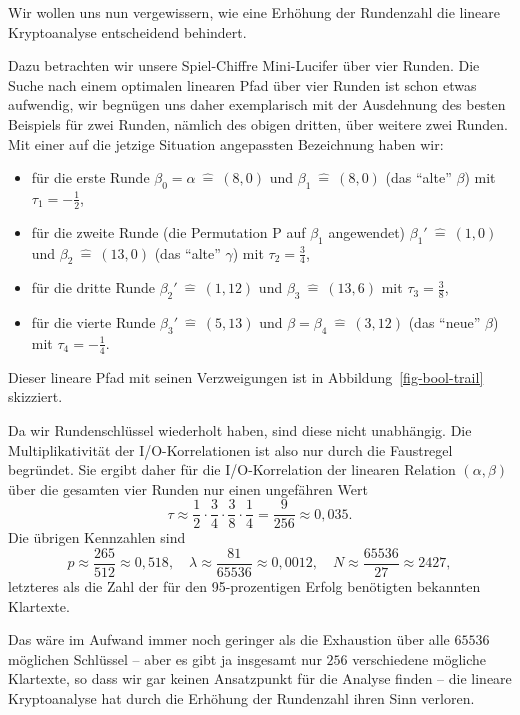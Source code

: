 \begin{refsegment}
Wir wollen uns nun vergewissern, wie eine Erhöhung der Rundenzahl die
lineare Kryptoanalyse
entscheidend behindert.

Dazu betrachten wir unsere Spiel-Chiffre Mini-Lucifer
über vier Runden. Die Suche nach einem optimalen linearen
Pfad über vier Runden ist
schon etwas aufwendig, wir begnügen uns daher exemplarisch mit der
Ausdehnung des besten Beispiels für zwei Runden, nämlich des obigen
dritten, über weitere zwei Runden. Mit einer auf die jetzige
Situation angepassten Bezeichnung haben wir:
\begin{itemize}
   \item für die erste Runde $\beta_0 = \alpha \:\hat{=}\: (8,0)$ und
      $\beta_1 \:\hat{=}\: (8,0)$ (das "`alte"' $\beta$)
      mit $\tau_1 = -\frac{1}{2}$,
   \item für die zweite Runde (die Permutation P auf $\beta_1$ angewendet)
      $\beta_1' \:\hat{=}\: (1,0)$ und $\beta_2 \:\hat{=}\: (13,0)$
      (das "`alte"' $\gamma$) mit $\tau_2 = \frac{3}{4}$,
   \item für die dritte Runde $\beta_2' \:\hat{=}\: (1,12)$ und
      $\beta_3 \:\hat{=}\: (13,6)$ mit $\tau_3 = \frac{3}{8}$,
   \item für die vierte Runde $\beta_3' \:\hat{=}\: (5,13)$ und
      $\beta = \beta_4 \:\hat{=}\: (3,12)$ (das "`neue"' $\beta$)
      mit $\tau_4 = -\frac{1}{4}$.
\end{itemize}
Dieser lineare Pfad mit seinen Verzweigungen ist in
Abbildung~\ref{fig-bool-trail} skizziert.

Da wir Rundenschlüssel wiederholt haben,
sind diese nicht unabhängig. Die Multiplikativität der
I/O-Korrelationen ist also nur durch die
Faustregel begründet. Sie ergibt daher für die I/O-Korrelation der
linearen Relation $(\alpha, \beta)$ über die gesamten vier Runden
nur einen ungefähren Wert
\[
     \tau \approx \frac{1}{2} \cdot \frac{3}{4} \cdot \frac{3}{8} \cdot \frac{1}{4}
     = \frac{9}{256} \approx 0,035.
\]
Die übrigen Kennzahlen sind
\[
     p \approx \frac{265}{512} \approx 0,518, \quad
     \lambda \approx \frac{81}{65536} \approx 0,0012, \quad
     N \approx \frac{65536}{27} \approx 2427,
\]
letzteres als die Zahl der für den 95-prozentigen Erfolg benötigten bekannten
Klartexte.

Das wäre im Aufwand immer noch geringer als die Exhaustion über alle
$65536$ möglichen Schlüssel -- aber es gibt ja insgesamt nur $256$
verschiedene mögliche Klartexte, so dass wir gar keinen Ansatzpunkt
für die Analyse finden -- die lineare
Kryptoanalyse
hat durch die Erhöhung der Rundenzahl ihren Sinn verloren.


\end{refsegment}
